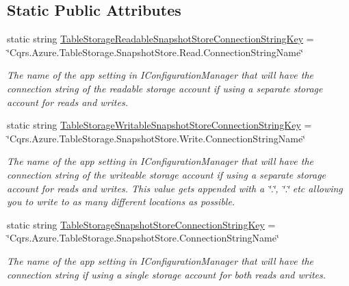 \subsection*{Static Public Attributes}
\begin{DoxyCompactItemize}
\item 
static string \hyperlink{classCqrs_1_1Azure_1_1BlobStorage_1_1Events_1_1TableStorageSnapshotStoreConnectionStringFactory_add2ff350d26fed88d8c18737d3895663_add2ff350d26fed88d8c18737d3895663}{Table\+Storage\+Readable\+Snapshot\+Store\+Connection\+String\+Key} = \char`\"{}Cqrs.\+Azure.\+Table\+Storage.\+Snapshot\+Store.\+Read.\+Connection\+String\+Name\char`\"{}
\begin{DoxyCompactList}\small\item\em The name of the app setting in I\+Configuration\+Manager that will have the connection string of the readable storage account if using a separate storage account for reads and writes. \end{DoxyCompactList}\item 
static string \hyperlink{classCqrs_1_1Azure_1_1BlobStorage_1_1Events_1_1TableStorageSnapshotStoreConnectionStringFactory_a7bb0a4b42242b523df90611e8c28a4e6_a7bb0a4b42242b523df90611e8c28a4e6}{Table\+Storage\+Writable\+Snapshot\+Store\+Connection\+String\+Key} = \char`\"{}Cqrs.\+Azure.\+Table\+Storage.\+Snapshot\+Store.\+Write.\+Connection\+String\+Name\char`\"{}
\begin{DoxyCompactList}\small\item\em The name of the app setting in I\+Configuration\+Manager that will have the connection string of the writeable storage account if using a separate storage account for reads and writes. This value gets appended with a \char`\"{}.\char`\"{}, \char`\"{}.\char`\"{} etc allowing you to write to as many different locations as possible. \end{DoxyCompactList}\item 
static string \hyperlink{classCqrs_1_1Azure_1_1BlobStorage_1_1Events_1_1TableStorageSnapshotStoreConnectionStringFactory_aeb34e21116be39f3f34e5970001f3762_aeb34e21116be39f3f34e5970001f3762}{Table\+Storage\+Snapshot\+Store\+Connection\+String\+Key} = \char`\"{}Cqrs.\+Azure.\+Table\+Storage.\+Snapshot\+Store.\+Connection\+String\+Name\char`\"{}
\begin{DoxyCompactList}\small\item\em The name of the app setting in I\+Configuration\+Manager that will have the connection string if using a single storage account for both reads and writes. \end{DoxyCompactList}\item 

\end{DoxyCompactItemize}
